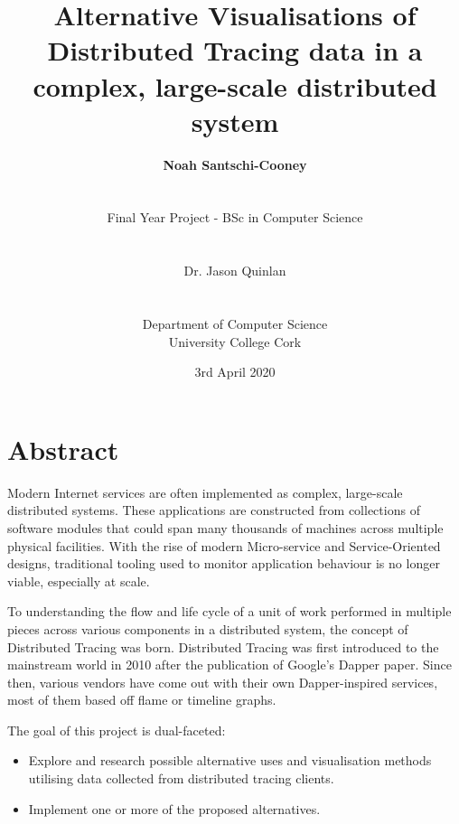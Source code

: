 \documentclass[12pt,pdftex,titlepage]{report}
\author{\textbf{Noah Santschi-Cooney}
\\\\\\\small{Final Year Project - BSc in Computer Science}
\\\\\\\small{Dr. Jason Quinlan}
\\\\\\\small{Department of Computer Science}
\\\small{University College Cork}}
\title{\textbf{Alternative Visualisations of Distributed Tracing data in a complex, large-scale distributed system}}
\date{\vfill\small{3rd April 2020}}
\begin{document}
    \maketitle    

    \chapter*{Abstract}
        Modern Internet services are often implemented as complex, large-scale distributed systems. These applications are constructed from collections 
        of software modules that could span many thousands of machines across multiple physical facilities. With the rise of modern Micro-service and 
        Service-Oriented designs, traditional tooling used to monitor application behaviour is no longer viable, especially at scale. 
        
        To understanding the flow and life cycle of a unit of work performed in multiple pieces across various components in a distributed system, the concept of 
        Distributed Tracing was born. Distributed Tracing was first introduced to the mainstream world in 2010 after the publication of Google’s Dapper
        paper. Since then, various vendors have come out with their own Dapper-inspired services, most of them based off flame or timeline graphs. 
        
        The goal of this project is dual-faceted:
        \begin{itemize}
            \item Explore and research possible alternative uses and visualisation methods utilising data collected from distributed tracing clients.
            \item Implement one or more of the proposed alternatives.
        \end{itemize}
\end{document}
